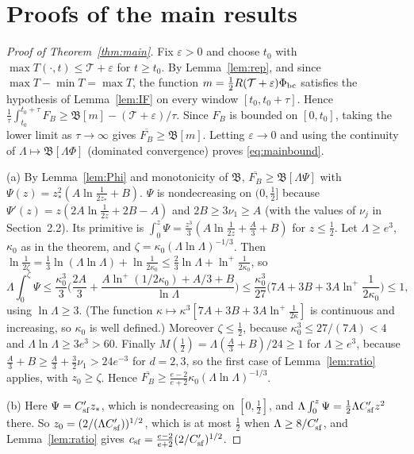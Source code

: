 \section{Proofs of the main results}\label{sec:proofs}

\begin{proof}[Proof of Theorem~\ref{thm:main}]
Fix $\varepsilon>0$ and choose $t_0$ with $\max T(\cdot,t)\le\mathcal T+\varepsilon$ for $t\ge t_0$. By
Lemma~\ref{lem:rep}, and since $\max T-\min T=\max T$, the function $m=\tfrac12R(\mathcal
T+\varepsilon)\Phi_{\rm bc}$ satisfies the hypothesis of Lemma~\ref{lem:IF} on every window
$[t_0,t_0+\tau]$. Hence $\frac1\tau\int_{t_0}^{t_0+\tau}F_B\ge\mathfrak B[m]-(\mathcal T+\varepsilon)/\tau$. Since
$F_B$ is bounded on $[0,t_0]$, taking the lower limit as $\tau\to\infty$ gives $\overline{F_B}\ge\mathfrak B[m]$.
Letting $\varepsilon\to0$ and using the continuity of $\Lambda\mapsto\mathfrak B[\Lambda\Phi]$ (dominated convergence)
proves \eqref{eq:mainbound}.

(a) By Lemma~\ref{lem:Phi} and monotonicity of $\mathfrak B$, $\overline{F_B}\ge\mathfrak B[\Lambda\Psi]$
with $\Psi(z)=z_*^2(A\ln\frac1{2z_*}+B)$. $\Psi$ is nondecreasing on $(0,\frac12]$ because
$\Psi'(z)=z(2A\ln\frac1{2z}+2B-A)$ and $2B\ge3\nu_1\ge A$ (with the values of $\nu_j$ in Section~2.2). Its
primitive is $\int_0^z\Psi=\frac{z^3}3(A\ln\frac1{2z}+\frac A3+B)$ for $z\le\frac12$. Let $\Lambda\ge e^3$,
$\kappa_0$ as in the theorem, and $\zeta=\kappa_0(\Lambda\ln\Lambda)^{-1/3}$. Then
$\ln\frac1{2\zeta}=\frac13\ln(\Lambda\ln\Lambda)+\ln\frac1{2\kappa_0}\le\frac23\ln\Lambda+\ln^+\frac1{2\kappa_0}$, so
\[
\Lambda\int_0^\zeta\Psi\le\frac{\kappa_0^3}{3}\Big(\frac{2A}3+\frac{A\ln^+(1/2\kappa_0)+A/3+B}{\ln\Lambda}\Big)
\le\frac{\kappa_0^3}{27}\Big(7A+3B+3A\ln^+\frac1{2\kappa_0}\Big)\le1 ,
\]
using $\ln\Lambda\ge3$. (The function $\kappa\mapsto\kappa^3[7A+3B+3A\ln^+\frac1{2\kappa}]$ is continuous and
increasing, so $\kappa_0$ is well defined.) Moreover $\zeta\le\frac12$, because $\kappa_0^3\le27/(7A)<4$ and
$\Lambda\ln\Lambda\ge3e^3>60$. Finally $M(\frac12)=\Lambda(\frac A3+B)/24\ge1$ for $\Lambda\ge e^3$, because
$\frac A3+B\ge\frac A3+\frac32\nu_1>24e^{-3}$ for $d=2,3$, so the first case of Lemma~\ref{lem:ratio} applies, with
$z_0\ge\zeta$. Hence $\overline{F_B}\ge\frac{e-2}{e+2}\kappa_0(\Lambda\ln\Lambda)^{-1/3}$.

(b) Here $\Psi=C'_{\rm sf}z_*$, which is nondecreasing on $[0,\frac12]$, and $\Lambda\int_0^z\Psi=\frac12\Lambda
C'_{\rm sf}z^2$ there. So $z_0=(2/(\Lambda C'_{\rm sf}))^{1/2}$, which is at most $\frac12$ when $\Lambda\ge8/C'_{\rm sf}$,
and Lemma~\ref{lem:ratio} gives $c_{\rm sf}=\frac{e-2}{e+2}(2/C'_{\rm sf})^{1/2}$.
\end{proof}

